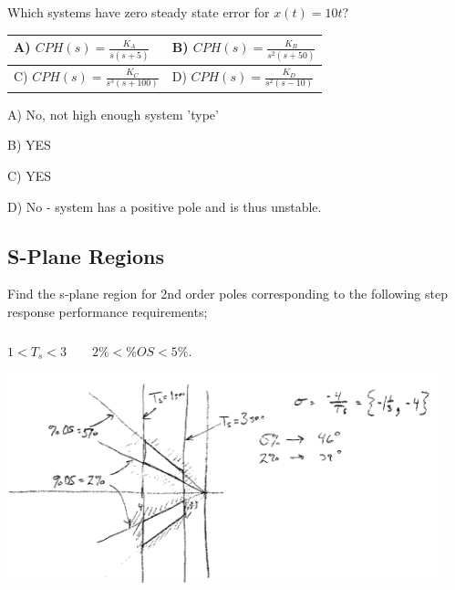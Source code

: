 \documentclass{article}	%
\begin{document}



\subsection{}
  Which systems have zero steady state error for $x(t) = 10t$?\\[0.25in]

\begin{center}


\renewcommand\arraystretch{2.0}%
\begin{tabular}{|l|l|}  \hline
A) $CPH(s) = \frac{K_A}{s(s+5)}$		&	B) $CPH(s) = \frac{K_B}{s^2(s+50)}$   \\  \hline
C) $CPH(s) = \frac{K_C}{s^3(s+100)}$		&	D) $CPH(s) = \frac{K_D}{s^2(s-10)}$   \\  \hline
\end{tabular}
\end{center}

\begin{solution}
A) No, not high enough system 'type'

B) YES

C) YES

D) No - system has a positive pole and is thus unstable.
\end{solution}


\subsection{S-Plane Regions}

  Find the s-plane region for 2nd order poles corresponding to the following step response performance requirements;


\subsubsection{}$1<T_s<3 \qquad 2\% < \%OS < 5\%$.

\includegraphics[width=12.5cm]{00547a.png}	%
\end{document}
